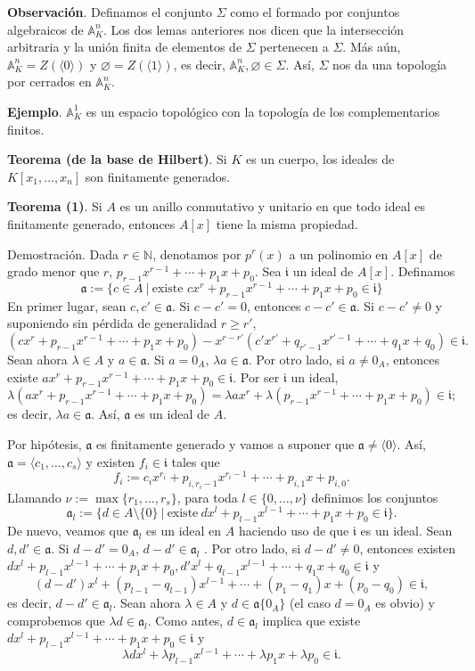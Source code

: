 \documentclass[a4paper,12pt]{article}
\newcommand{\N}{\mathbb{N}}
\newcommand{\A}{\mathbb{A}}
\newcommand{\af}{\mathfrak{a}}
\begin{document}
\textbf{Observación}. Definamos el conjunto $\Sigma$ como el formado por conjuntos algebraicos de $\A_K^n$. Los dos lemas anteriores nos dicen que la intersección arbitraria y la unión finita de elementos de $\Sigma$ pertenecen a $\Sigma$. Más aún, $\A_K^n=Z(\langle 0\rangle)$ y $\varnothing=Z(\langle1\rangle)$, es decir, $\A_K^n,\varnothing\in\Sigma$. Así, $\Sigma$ nos da una topología por cerrados en $\A_K^n$.

\textbf{Ejemplo}. $\A_K^1$ es un espacio topológico con la topología de los complementarios finitos.

\textbf{Teorema (de la base de Hilbert)}. Si $K$ es un cuerpo, los ideales de $K[x_1,\dots,x_n]$ son finitamente generados.

\textbf{Teorema (1)}. Si $A$ es un anillo conmutativo y unitario en que todo ideal es finitamente generado, entonces $A[x]$ tiene la misma propiedad.

Demostración. Dada $r\in\N$, denotamos por $p^r(x)$ a un polinomio en $A[x]$ de grado menor que $r$, $p_{r-1}x^{r-1}+\cdots+p_1x+p_0$. Sea $\mathfrak{i}$ un ideal de $A[x]$. Definamos$$\af:=\{c\in A\ |\ \text{existe } cx^r+p_{r-1}x^{r-1}+\cdots+p_1x+p_0\in \mathfrak{i}\}$$En primer lugar, sean $c,c'\in\af$. Si $c-c'=0$, entonces $c-c'\in\af$. Si $c-c'\neq 0$ y suponiendo sin pérdida de generalidad $r\ge r'$, $$(cx^r+p_{r-1}x^{r-1}+\cdots+p_1x+p_0)-x^{r-r'}(c'x^{r'}+q_{r'-1}x^{r'-1}+\cdots+q_1x+q_0)\in \mathfrak{i}.$$
Sean ahora $\lambda\in A$ y $a\in\af$. Si $a=0_A$, $\lambda a\in\af$. Por otro lado, si $a\neq0_A$, entonces existe $ax^r+p_{r-1}x^{r-1}+\cdots+p_1x+p_0\in \mathfrak{i}$. Por ser $\mathfrak{i}$ un ideal,$$\lambda(ax^r+p_{r-1}x^{r-1}+\cdots+p_1x+p_0)=\lambda ax^r+\lambda(p_{r-1}x^{r-1}+\cdots+p_1x+p_0)\in \mathfrak{i};$$
es decir, $\lambda a\in\af$. Así, $\af$ es un ideal de $A$.

Por hipótesis, $\af$ es finitamente generado y vamos a suponer que $\af\neq\langle0\rangle$. Así, $\af=\langle c_1,\dots,c_s\rangle$ y existen $f_i\in \mathfrak{i}$ tales que$$f_i:=c_ix^{r_i}+p_{i,r_i-1}x^{r_i-1}+\cdots+p_{i,1}x+p_{i,0}.$$
Llamando $\nu:=\max\{r_1,\dots,r_s\}$, para toda $l\in\{0,\dots,\nu\}$ definimos los conjuntos$$\af_l:=\{d\in A\setminus\{0\}\ |\ \text{existe}\ dx^l+p_{l-1}x^{l-1}+\cdots+p_1x+p_0\in \mathfrak{i}\}.$$
De nuevo, veamos que $\af_l$ es un ideal en $A$ haciendo uso de que $\mathfrak{i}$ es un ideal. Sean $d,d'\in\af$. Si $d-d'=0_A$, $d-d'\in\af_l$ . Por otro lado, si $d-d'\neq 0$, entonces existen $dx^l+p_{l-1}x^{l-1}+\cdots+p_1x+p_0, d'x^l+q_{l-1}x^{l-1}+\cdots+q_1x+q_0\in \mathfrak{i}$ y$$(d-d')x^l+(p_{l-1}-q_{l-1})x^{l-1}+\cdots+(p_1-q_1)x+(p_0-q_0)\in \mathfrak{i},$$
es decir, $d-d'\in\af_l$. Sean ahora $\lambda\in A$ y $d\in\af\{0_A\}$ (el caso $d=0_A$ es obvio) y comprobemos que $\lambda d\in\af_l$. Como antes, $d\in\af_l$ implica que existe $dx^l+p_{l-1}x^{l-1}+\cdots+p_1x+p_0\in \mathfrak{i}$ y$$\lambda dx^l+\lambda p_{l-1}x^{l-1}+\cdots+\lambda p_1x+\lambda p_0\in \mathfrak{i}.$$
\end{document}
